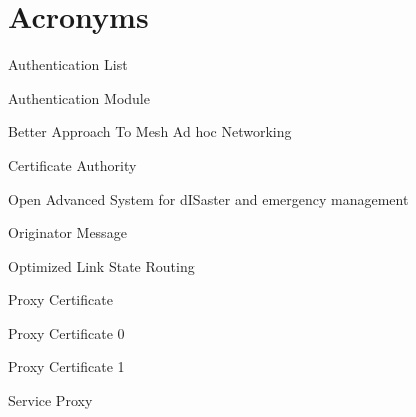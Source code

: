 \chapter*{Acronyms}

\begin{acronym}


 {Authentication List}

 {Authentication Module}

 {Better Approach To Mesh Ad hoc Networking}

 {Certificate Authority}










 {Open Advanced System for dISaster and emergency management}

 {Originator Message}

 {Optimized Link State Routing}


 {Proxy Certificate}

 {Proxy Certificate 0}

 {Proxy Certificate 1}





 {Service Proxy}


%

\end{acronym}
